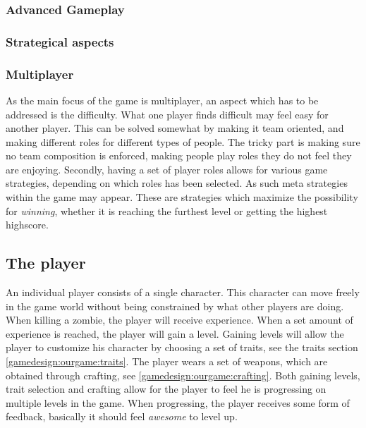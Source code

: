 \subsubsection{Advanced Gameplay}


\subsubsection{Strategical aspects}


\subsubsection{Multiplayer}


As the main focus of the game is multiplayer, an aspect which has to be addressed is the difficulty. What one player finds difficult may feel easy for another player. This can be solved somewhat by making it team oriented, and making different roles for different types of people. The tricky part is making sure no team composition is enforced, making people play roles they do not feel they are enjoying. 
Secondly, having a set of player roles allows for various game strategies, depending on which roles has been selected. As such meta strategies within the game may appear. These are strategies which maximize the possibility for \emph{winning}, whether it is reaching the furthest level or getting the highest highscore. 

\subsection*{The player}
 An individual player consists of a single character. This character can move freely in the game world without being constrained by what other players are doing. When killing a zombie, the player will receive experience. When a set amount of experience is reached, the player will gain a level. Gaining levels will allow the player to customize his character by choosing a set of traits, see the traits section \ref{gamedesign:ourgame:traits}. The player wears a set of weapons, which are obtained through crafting, see \ref{gamedesign:ourgame:crafting}. Both gaining levels, trait selection and crafting allow for the player to feel he is progressing on multiple levels in the game. When progressing, the player receives some form of feedback, basically it should feel \emph{awesome} to level up.

